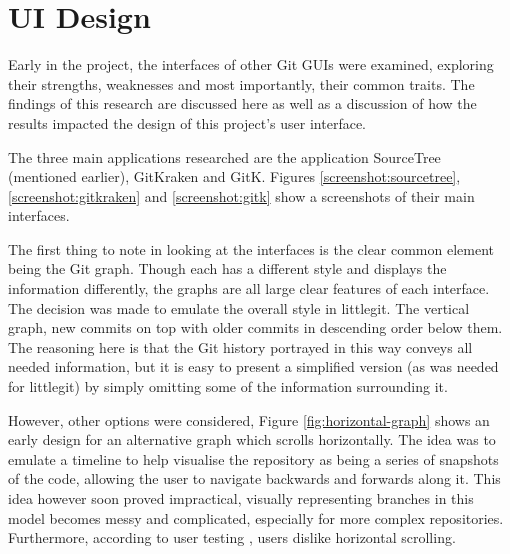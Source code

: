 \section{UI Design}
 
Early in the project, the interfaces of other Git GUIs were examined, exploring their strengths, weaknesses and most importantly, their common traits. The findings of this research are discussed here as well as a discussion of how the results impacted the design of this project's user interface.

The three main applications researched are the application SourceTree \cite{sourcetree} (mentioned earlier), GitKraken\cite{gitkraken} and GitK\cite{gitk}. Figures \ref{screenshot:sourcetree}, \ref{screenshot:gitkraken} and \ref{screenshot:gitk} show a screenshots of their main interfaces.




The first thing to note in looking at the interfaces is the clear common element being the Git graph. Though each has a different style and displays the information differently, the graphs are all large clear features of each interface. The decision was made to emulate the overall style in littlegit. The vertical graph, new commits on top with older commits in descending order below them. The reasoning here is that the Git history portrayed in this way conveys all needed information, but it is easy to present a simplified version (as was needed for littlegit) by simply omitting some of the information surrounding it.

However, other options were considered, Figure \ref{fig:horizontal-graph} shows an early design for an alternative graph which scrolls horizontally. The idea was to emulate a timeline to help visualise the repository as being a series of snapshots of the code, allowing the user to navigate backwards and forwards along it. This idea however soon proved impractical, visually representing branches in this model becomes messy and complicated, especially for more complex repositories. Furthermore, according to user testing \cite{horizontalScrolling}, users dislike horizontal scrolling.

